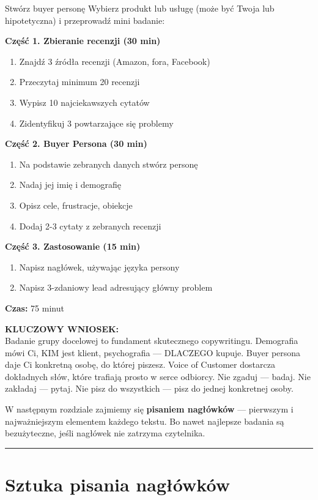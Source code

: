 \documentclass[
  12pt,
  a4paper,
  twoside,
  openright,
  12pt,
  DIV=12,
  BCOR=12mm]{scrbook}
\newcommand{\decoline}{%
  \begin{center}
    \textcolor{bordergray}{\rule{0.3\textwidth}{0.5pt}}
  \end{center}
}
\newcommand{\takeaway}[1]{%
  \begin{tcolorbox}[
    enhanced,
    colback=accentgreen!10,
    colframe=accentgreen,
    boxrule=0pt,
    borderline south={3pt}{0pt}{accentgreen},
    sharp corners,
    left=15pt, right=15pt, top=10pt, bottom=10pt
  ]
    \textbf{\color{accentgreen}KLUCZOWY WNIOSEK:}\\[5pt]
    #1
  \end{tcolorbox}
}
\begin{document}
\begin{cwiczenie}{Stwórz buyer personę}
Wybierz produkt lub usługę (może być Twoja lub hipotetyczna) i przeprowadź mini badanie:

\textbf{Część 1. Zbieranie recenzji (30 min)}
\begin{enumerate}
  \item Znajdź 3 źródła recenzji (Amazon, fora, Facebook)
  \item Przeczytaj minimum 20 recenzji
  \item Wypisz 10 najciekawszych cytatów
  \item Zidentyfikuj 3 powtarzające się problemy
\end{enumerate}

\textbf{Część 2. Buyer Persona (30 min)}
\begin{enumerate}
  \item Na podstawie zebranych danych stwórz personę
  \item Nadaj jej imię i demografię
  \item Opisz cele, frustracje, obiekcje
  \item Dodaj 2-3 cytaty z zebranych recenzji
\end{enumerate}

\textbf{Część 3. Zastosowanie (15 min)}
\begin{enumerate}
  \item Napisz nagłówek, używając języka persony
  \item Napisz 3-zdaniowy lead adresujący główny problem
\end{enumerate}

\textbf{Czas:} 75 minut
\end{cwiczenie}

\takeaway{Badanie grupy docelowej to fundament skutecznego copywritingu. Demografia mówi Ci, KIM jest klient, psychografia --- DLACZEGO kupuje. Buyer persona daje Ci konkretną osobę, do której piszesz. Voice of Customer dostarcza dokładnych słów, które trafiają prosto w serce odbiorcy. Nie zgaduj --- badaj. Nie zakładaj --- pytaj. Nie pisz do wszystkich --- pisz do jednej konkretnej osoby.}

W następnym rozdziale zajmiemy się \textbf{pisaniem nagłówków} ---
pierwszym i najważniejszym elementem każdego tekstu. Bo nawet najlepsze
badania są bezużyteczne, jeśli nagłówek nie zatrzyma czytelnika.

\decoline


\chapter{Sztuka pisania
nagłówków}\label{sztuka-pisania-nagux142uxf3wkuxf3w}
\end{document}
